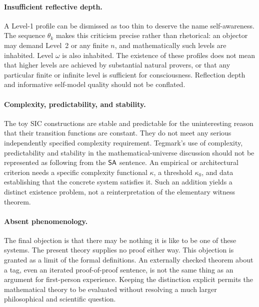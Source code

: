 \documentclass[11pt,letterpaper]{article}
\begin{document}
\paragraph{Insufficient reflective depth.}
A Level-1 profile can be dismissed as too thin to deserve the name self-awareness. The sequence $\theta_k$ makes this criticism precise rather than rhetorical: an objector may demand Level~2 or any finite $n$, and mathematically such levels are inhabited. Level $\omega$ is also inhabited. The existence of these profiles does not mean that higher levels are achieved by substantial natural provers, or that any particular finite or infinite level is sufficient for consciousness. Reflection depth and informative self-model quality should not be conflated.

\paragraph{Complexity, predictability, and stability.}
The toy SIC constructions are stable and predictable for the uninteresting reason that their transition functions are constant. They do not meet any serious independently specified complexity requirement. Tegmark's use of complexity, predictability and stability in the mathematical-universe discussion should not be represented as following from the $\mathsf{SA}$ sentence. An empirical or architectural criterion needs a specific complexity functional $\kappa$, a threshold $\kappa_0$, and data establishing that the concrete system satisfies it. Such an addition yields a distinct existence problem, not a reinterpretation of the elementary witness theorem.

\paragraph{Absent phenomenology.}
The final objection is that there may be nothing it is like to be one of these systems. The present theory supplies no proof either way. This objection is granted as a limit of the formal definitions. An externally checked theorem about a tag, even an iterated proof-of-proof sentence, is not the same thing as an argument for first-person experience. Keeping the distinction explicit permits the mathematical theory to be evaluated without resolving a much larger philosophical and scientific question.
\end{document}
